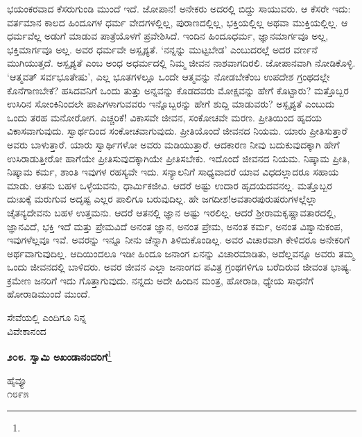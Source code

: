 ಭಯಂಕರವಾದ ಕೆಸರುಗುಂಡಿ ಮುಂದೆ ಇದೆ. ಜೋಪಾನ! ಅನೇಕರು ಅದರಲ್ಲಿ ಬಿದ್ದು ಸಾಯುವರು. ಆ ಕೆಸರೇ ಇದು: ವರ್ತಮಾನ ಕಾಲದ ಹಿಂದೂಗಳ ಧರ್ಮ ವೇದಗಳಲ್ಲಿಲ್ಲ, ಪುರಾಣದಲ್ಲಿಲ್ಲ, ಭಕ್ತಿಯಲ್ಲಿಲ್ಲ ಅಥವಾ ಮುಕ್ತಿಯಲ್ಲಿಲ್ಲ. ಆ ಧರ್ಮವೆಲ್ಲ ಅಡುಗೆ ಮಾಡುವ ಪಾತ್ರೆಯೊಳಗೆ ಪ್ರವೇಶಿಸಿದೆ. ಇಂದಿನ ಹಿಂದೂಧರ್ಮ, ಜ್ಞಾನಮಾರ್ಗವೂ ಅಲ್ಲ, ಭಕ್ತಿಮಾರ್ಗವೂ ಅಲ್ಲ. ಅವರ ಧರ್ಮವೇ ಅಸ್ಪೃಶ್ಯತೆ. ‘ನನ್ನನ್ನು ಮುಟ್ಟಬೇಡ’ ಎಂಬುದರಲ್ಲೆ ಅದರ ವರ್ಣನೆ ಮುಗಿಯುತ್ತದೆ. ಅಸ್ಪೃಶ್ಯತೆ ಎಂಬ ಅಂಧ ಅಧರ್ಮದಲ್ಲಿ ನಿಮ್ಮ ಜೀವನ ನಾಶವಾಗದಿರಲಿ. ಜೋಪಾನವಾಗಿ ನೋಡಿಕೊಳ್ಳಿ. ‘ಆತ್ಮವತ್ ಸರ್ವಭೂತೇಷು’, ಎಲ್ಲ ಭೂತಗಳಲ್ಲೂ ಒಂದೇ ಆತ್ಮವನ್ನು ನೋಡಬೇಕೆಂಬ ಉಪದೇಶ ಗ್ರಂಥದಲ್ಲೇ ಕೊನೆಗಾಣಬೇಕೆ? ಹಸಿದವನಿಗೆ ಒಂದು ತುತ್ತು ಅನ್ನವನ್ನು ಕೊಡದವರು ಮೋಕ್ಷವನ್ನು ಹೇಗೆ ಕೊಟ್ಟಾರು? ಮತ್ತೊಬ್ಬರ ಉಸಿರಿನ ಸೋಂಕಿನಿಂದಲೇ ಪಾಪಿಗಳಾಗುವವರು ಇನ್ನೊಬ್ಬರನ್ನು ಹೇಗೆ ಶುದ್ದಿ ಮಾಡುವರು? ಅಸ್ಪೃಶ್ಯತೆ ಎಂಬುದು ಒಂದು ತರಹ ಮನೋರೋಗ. ಎಚ್ಚರಿಕೆ! ವಿಕಾಸವೇ ಜೀವನ, ಸಂಕೋಚವೇ ಮರಣ. ಪ್ರೀತಿಯಿಂದ ಹೃದಯ ವಿಕಾಸವಾಗುವುದು. ಸ್ವಾರ್ಥದಿಂದ ಸಂಕೋಚವಾಗುವುದು. ಪ್ರೀತಿಯೊಂದೆ ಜೀವನದ ನಿಯಮ. ಯಾರು ಪ್ರೀತಿಸುತ್ತಾರೆ ಅವರು ಬಾಳುತ್ತಾರೆ. ಯಾರು ಸ್ವಾರ್ಥಿಗಳೋ ಅವರು ಮಡಿಯುತ್ತಾರೆ. ಆದಕಾರಣ ನೀವು ಬದುಕುವುದಕ್ಕಾಗಿ ಹೇಗೆ ಉಸಿರಾಡುತ್ತೀರೋ ಹಾಗೆಯೇ ಪ್ರೀತಿಸುವುದಕ್ಕಾಗಿಯೇ ಪ್ರೀತಿಸಬೇಕು. ಇದೊಂದೆ ಜೀವನದ ನಿಯಮ. ನಿಷ್ಕಾಮ ಪ್ರೀತಿ, ನಿಷ್ಕಾಮ ಕರ್ಮ, ಶಾಂತಿ ಇವುಗಳ ರಹಸ್ಯವೇ ಇದು. ಸನ್ಯಾಲನಿಗೆ ಸಾಧ್ಯವಾದರೆ ಯಾವ ವಿಧದಲ್ಲಾದರೂ ಸಹಾಯ ಮಾಡು. ಆತನು ಬಹಳ ಒಳ್ಳೆಯವನು, ಧಾರ್ಮಿಕಜೀವಿ. ಆದರೆ ಅಷ್ಟು ಉದಾರ ಹೃದಯದವನಲ್ಲ. ಮತ್ತೊಬ್ಬರ ದುಃಖಕ್ಕೆ ಮರುಗುವ ಅದೃಷ್ಟ ಎಲ್ಲರ ಪಾಲಿಗೂ ಬರುವುದಿಲ್ಲ. ಹೇ ಜಗದೀಶ!ಅವತಾರಪುರುಷರುಗಳಲ್ಲೆಲ್ಲಾ ಚೈತನ್ಯದೇವನು ಬಹಳ\enginline{-} ಉತ್ತಮನು. ಆದರೆ ಆತನಲ್ಲಿ ಜ್ಞಾನ ಅಷ್ಟು ಇರಲಿಲ್ಲ. ಆದರೆ ಶ‍್ರೀರಾಮಕೃಷ್ಣಾವತಾರದಲ್ಲಿ, ಜ್ಞಾನವಿದೆ, ಭಕ್ತಿ ಇದೆ ಮತ್ತು ಪ್ರೇಮವಿದೆ\enginline{-} ಅನಂತ ಜ್ಞಾನ, ಅನಂತ ಪ್ರೇಮ, ಅನಂತ ಕರ್ಮ, ಅನಂತ ವಿಶ್ವಾನುಕಂಪ, ಇವುಗಳೆಲ್ಲವೂ ಇವೆ. ಅವರನ್ನು ಇನ್ನೂ ನೀನು ಚೆನ್ನಾಗಿ ತಿಳಿದುಕೊಂಡಿಲ್ಲ. ಅವರ ವಿಚಾರವಾಗಿ ಕೇಳಿದರೂ ಅನೇಕರಿಗೆ ಅರ್ಥವಾಗುವುದಿಲ್ಲ. ಆದಿಯಿಂದಲೂ ಇಡೀ ಹಿಂದೂ ಜನಾಂಗ ಏನನ್ನು ವಿಚಾರಮಾಡಿತು, ಅದೆಲ್ಲವನ್ನೂ ಅವರು ತಮ್ಮ ಒಂದು ಜೀವನದಲ್ಲಿ ಬಾಳಿದರು. ಅವರ ಜೀವನ ಎಲ್ಲಾ ಜನಾಂಗದ ಪವಿತ್ರ ಗ್ರಂಥಗಳಿಗೂ ಬರೆದಿರುವ ಜೀವಂತ ಭಾಷ್ಯ. ಕ್ರಮೇಣ ಜನರಿಗೆ ಇದು ಗೊತ್ತಾಗುವುದು. ನನ್ನದು ಅದೇ ಹಿಂದಿನ ಮಂತ್ರ, ಹೋರಾಡಿ, ಧ್ಯೇಯ ಸಾಧನೆಗೆ ಹೋರಾಡಿ\enginline{-}ಮುಂದೆ ಮುಂದೆ.

{\flushright
ಸೇವೆಯಲ್ಲಿ ಎಂದಿಗೂ ನಿನ್ನ\\ವಿವೇಕಾನಂದ\par}

\begin{center}
\textbf{೨೦೮. ಸ್ವಾಮಿ ಅಖಂಡಾನಂದರಿಗೆ}\footnote{}
\end{center}

\vspace{-0.5cm}
	
\begin{flushright}
ಹೈವ್ಯೂ\\೧೮೯೫
\end{flushright}

\vspace{-0.4cm}

